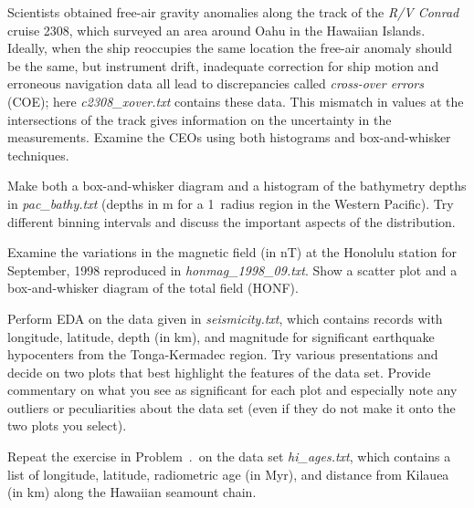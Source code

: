 \begin{problem}
Scientists obtained free-air gravity anomalies along the track of the \emph{R/V Conrad} cruise 2308, which surveyed an area
around Oahu in the Hawaiian Islands.  Ideally, when the ship reoccupies the same location the free-air anomaly should be
the same, but instrument drift, inadequate correction for ship motion and erroneous navigation data all lead to discrepancies
called \emph{cross-over errors} (COE); here \emph{c2308\_xover.txt} contains these data.
This mismatch in values at the intersections of the track gives information on the uncertainty in the measurements.
Examine the CEOs using both histograms and box-and-whisker techniques.
\end{problem}

\begin{problem}
Make both a box-and-whisker diagram and a histogram of the bathymetry depths in \emph{pac\_bathy.txt}
(depths in m for a 1\DS\ radius region in the Western Pacific).  Try different binning intervals and discuss
the important aspects of the distribution.
\end{problem}

\begin{problem}
Examine the variations in the magnetic field (in nT) at the Honolulu station for September, 1998 reproduced in \emph{honmag\_1998\_09.txt}.
Show a scatter plot and a box-and-whisker diagram of the total field (HONF).
\end{problem}

\begin{problem}
\setcounter{EDA}{\theproblem}
Perform EDA on the data given in \emph{seismicity.txt}, which
contains records with longitude, latitude, depth (in km), and magnitude for significant
earthquake hypocenters from the Tonga-Kermadec region.  Try various presentations and
decide on two plots that best highlight the features of the data
set.  Provide commentary on what you see as significant for each plot and especially
note any outliers or peculiarities about the data set (even if they do not make it onto the two
plots you select).
\end{problem}

\begin{problem}
Repeat the exercise in Problem~\thechapter.\theEDA\ on the data set \emph{hi\_ages.txt}, which contains a
list of longitude, latitude, radiometric age (in Myr), and distance from Kilauea (in km) along the Hawaiian
seamount chain.
\end{problem}

